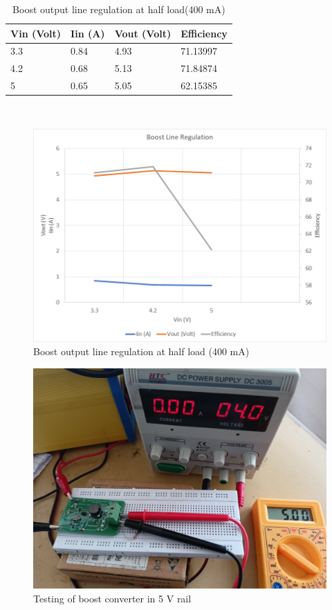 \begin{table}[H]
\centering
\begin{tabular}{|l|l|l|l|}
\hline
Vin (Volt) & Iin (A) & Vout (Volt) & Efficiency \\ \hline
3.3        & 0.84    & 4.93        & 71.13997   \\ \hline
4.2        & 0.68    & 5.13        & 71.84874   \\ \hline
5          & 0.65    & 5.05        & 62.15385   \\ \hline
\end{tabular}
\caption{Boost output line regulation at half load(400 mA)}
\label{table:4}
\end{table}
\\
\begin{figure}[H]
	\centering
	\includegraphics[width=\columnwidth]{IMGS/Boost output line regulation at half load (400mA).png}
	\caption{Boost output line regulation at half load (400 mA)}
	\label{fig:arch}
\end{figure}
\pagebreak

\begin{figure}[H]
	\centering
	\includegraphics[width=\columnwidth]{IMGS/TestSetupPics/Boost_out.jpg}
	\caption{Testing of boost converter in 5 V rail}
	\label{fig:arch}
\end{figure}
